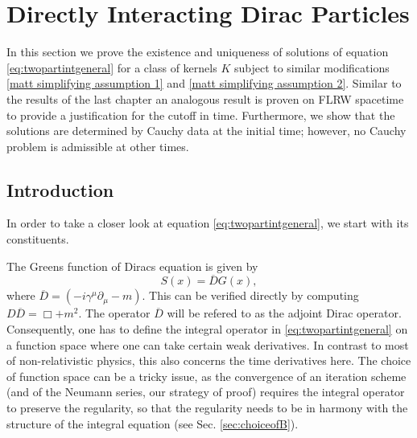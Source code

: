 \documentclass[b5paper,draft,openbib,12pt]{memoir}
\begin{document}



\section{Directly Interacting Dirac Particles}\label{sec:direct dirac}

In this section we prove the existence and uniqueness 
of solutions of equation \eqref{eq:twopartintgeneral}
for a class of kernels \(K\)
subject to similar modifications \ref{matt simplifying assumption 1}
and \ref{matt simplifying assumption 2}.
Similar to the results of the last chapter an analogous 
result is proven on FLRW spacetime to provide a justification 
for the cutoff in time.
Furthermore, we show that the solutions 
are determined by Cauchy data at the initial time; however, 
no Cauchy problem is admissible at other times. 
\subsection{Introduction}

In order to take a closer look at equation \eqref{eq:twopartintgeneral},
we start with its constituents.

The Greens function of Diracs equation is given by 
\begin{equation}
	S(x)= \overline{D}G(x),
\end{equation}
where \(\overline{D} = (-i \gamma^\mu \partial_\mu - m)\).
This can be verified directly by computing 
\(D\overline{D}=\Box +m^2\).
The operator \(\overline{D}\)
will be refered to as the adjoint Dirac operator.
Consequently, one has to define the integral operator in 
\eqref{eq:twopartintgeneral} on a function space where one can take 
certain weak derivatives. In contrast to most of non-relativistic 
physics, this also concerns the time derivatives here. The choice 
of function space can be a tricky issue, as the convergence of an 
iteration scheme (and of the Neumann series, our strategy of proof) 
requires the integral operator to preserve the regularity, so 
that the regularity needs to be in harmony with the structure 
of the integral equation (see Sec. \ref{sec:choiceofB}).
\end{document}
